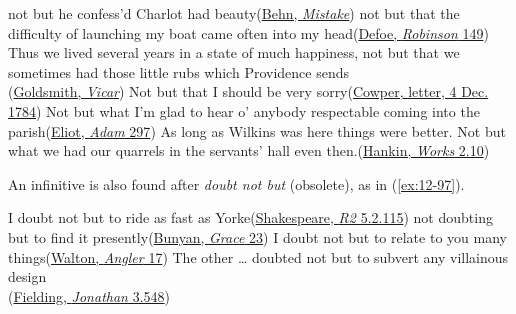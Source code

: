 \ea \label{ex:12-91}
\ea
not but he confess'd Charlot had beauty\hfill(\href{https://quod.lib.umich.edu/e/eebo/A27304.0001.001/1:4?rgn=div1;view=fulltext#W11-11-article}{Behn, \textit{Mistake}}) %
\ex
not but that the difficulty of launching my boat came often into my head\hfill(\href{https://archive.org/details/lifeandstranges00dobsgoog/page/n175/mode/2up?q=%22difficulty+of+launching%22&view=theater}{Defoe, \textit{Robinson} 149}) %
\ex
Thus we lived several years in a state of much happiness, not but that we sometimes had those little rubs which Providence sends\\\hfill(\href{https://archive.org/details/TheVicarOfWakefield/page/n45/mode/2up?q=%22Thus+we+lived+several%22&view=theater}{Goldsmith, \textit{Vicar}}) %
\ex
Not but that I should be very sorry\hfill(\href{https://www.gutenberg.org/cache/epub/47790/pg47790-images.html#Page_188}{Cowper, letter, 4 Dec. 1784})
\ex
Not but what I'm glad to hear o' anybody respectable coming into the parish\hfill(\href{https://archive.org/details/adambede00eliouoft/page/n313/mode/2up?q=%22not+but+what+I%27m%22&view=theater}{Eliot, \textit{Adam} 297})
\ex
As long as Wilkins was here things were better. Not but what we had our quarrels in the servants' hall even then.\hfill(\href{https://archive.org/details/dramaticworksofs02hank/page/8/mode/2up?q=%22As+long+as+Wilkins%22&view=theater}{Hankin, \textit{Works} 2.10}) %
\z
\z

An infinitive is also found after \textit{doubt not but} (obsolete), as in (\ref{ex:12-97}).

\ea \label{ex:12-97}
\ea
I doubt not but to ride as fast as Yorke\hfill(\href{https://internetshakespeare.uvic.ca/doc/R2_F1/scene/5.2/index.html#tln-2490}{Shakespeare, \textit{R2} 5.2.115}) %
\ex
not doubting but to find it presently\hfill(\href{https://archive.org/details/graceaboundingto00buny/page/34/mode/2up?q=%22doubting+but+to+find%22&view=theater}{Bunyan, \textit{Grace} 23})
\ex
I doubt not but to relate to you many things\hfill(\href{https://archive.org/details/compleatangler160000walt/page/70/mode/2up?view=theater&q=%22doubt+not+but+to+relate%22}{Walton, \textit{Angler} 17}) %
\ex
The other {\dots} doubted not but to subvert any villainous design\\\hfill(\href{https://archive.org/details/bim_eighteenth-century_jonathan-wild-the-his_fielding-henry_1795/page/136/mode/2up?q=%22doubted+not+but%22}{Fielding, \textit{Jonathan} 3.548}) %
\z
\z

